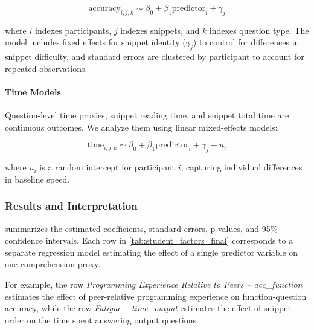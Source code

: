 \[
\text{accuracy}_{i,j,k} \sim \beta_0 + \beta_1 \text{predictor}_i + \gamma_j
\]

where $i$ indexes participants, $j$ indexes snippets, and $k$ indexes question type. The model includes fixed effects for snippet identity ($\gamma_j$) to control for differences in snippet difficulty, and standard errors are clustered by participant to account for repeated observations.

\paragraph{Time Models}

Question-level time proxies, snippet reading time, and snippet total time are continuous outcomes. We analyze them using linear mixed-effects models:

\[
\text{time}_{i,j,k} \sim \beta_0 + \beta_1 \text{predictor}_i + \gamma_j + u_i
\]

where $u_i$ is a random intercept for participant $i$, capturing individual differences in baseline speed.

\subsubsection{Results and Interpretation}

 summarizes the estimated coefficients, standard errors, p-values, and 95\% confidence intervals. Each row in \cref{tab:student_factors_final} corresponds to a separate regression model estimating the effect of a single predictor variable on one comprehension proxy.

For example, the row \emph{Programming Experience Relative to Peers -- acc\_function} estimates the effect of peer-relative programming experience on function-question accuracy, while the row \emph{Fatigue -- time\_output} estimates the effect of snippet order on the time spent answering output questions.


